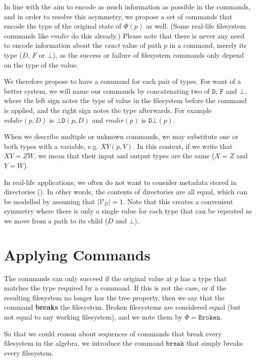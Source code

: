 \documentclass[12pt]{article}
\newcommand{\setvx}[1]{\mathcal{V}_{#1}}
\newcommand{\setd}{\setvx{D}}
\newcommand{\empt}{\bot}
\newcommand{\fsbroken}{\mathtt{Broken}} %
\newcommand{\FS}{\Phi} %
\newcommand{\cbrk}{\mathtt{break}}
\newcommand{\fscommand}[2]{{#1#2}}
\newcommand{\fsregcommandchar}[1]{\mathtt{#1}}
\newcommand{\fsregcommand}[2]{\fscommand{\fsregcommandchar{#1}}{\fsregcommandchar{#2}}}
\newcommand{\cbd}{\fsregcommand{\empt}{D}}
\newcommand{\cdb}{\fsregcommand{D}{\empt}}
\newcommand{\cxy}{\fscommand{X}{Y}}
\newcommand{\czw}{\fscommand{Z}{W}}
\theoremstyle{definition}
\begin{document}
In line with the aim to encode as much information as possible in the commands,
and in order to resolve this asymmetry, we propose a set of commands that encode
the type of the original state of $\FS(p)$ as well.
(Some real-life filesystem commands like $rmdir$ do this already.)
Please note that there is never any need to encode information about the
\emph{exact} value of path $p$ in a command, merely its type ($D$, $F$ or $\empt$),
as the success or failure of filesystem commands only depend on the type of the value.

We therefore propose to have a command for each pair of types.
For want of a better system, we will name our commands by concatenating
two of $\fsregcommandchar{D}$, $\fsregcommandchar{F}$ and $\fsregcommandchar{\empt}$, 
where the left sign notes the type of value
in the filesystem before the command is applied, and the right sign notes the type
afterwards. For example $mkdir(p,D)$ is $\cbd(p,D)$ and $rmdir(p)$ is $\cdb(p)$.

When we describe multiple or unknown commands, we may substitute one or both
types with a variable, e.g. $\cxy(p,V)$. In this context,
if we write that $\cxy=\czw$, we mean that their input and output types
are the same ($X=Z$ and $Y=W$).


In real-life applications, we often do not want to consider metadata stored in
directories (\cite{BZ}). In other words, the contents of directories are all equal,
which can be modelled by assuming that $|\setd|=1$.
Note that this creates a convenient symmetry where there is only a single value
for each type that can be repeated as we move from a path to its child ($D$ and $\empt$).

\section{Applying Commands}

The commands can only succeed if the original value at $p$ has a type that matches
the type required by a command. If this is not the case, or if the resulting
filesystem no longer has the tree property, then we say that the command
\textbf{breaks} the filesystem. Broken filesystems are considered equal
(but not equal to any working filesystem), and we note them by $\FS=\fsbroken$.

So that we could reason about sequences of commands that break every filesystem
in the algebra, we introduce the command $\cbrk$ that simply breaks every filesystem.
\end{document}
